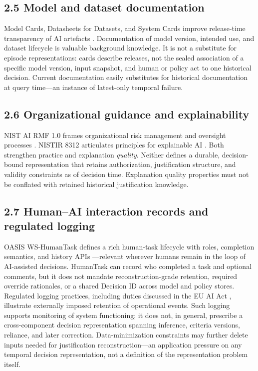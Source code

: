 \documentclass[11pt,a4paper]{article}
\begin{document}
\subsection{2.5 Model and dataset documentation}

Model Cards, Datasheets for Datasets, and System Cards improve release-time transparency of AI artefacts \citep{mitchell2019modelCards,gebru2021datasheets,procope2022systemCards}. Documentation of model version, intended use, and dataset lifecycle is valuable background knowledge. It is not a substitute for episode representations: cards describe releases, not the sealed association of a specific model version, input snapshot, and human or policy act to one historical decision. Current documentation easily substitutes for historical documentation at query time---an instance of latest-only temporal failure.


\subsection{2.6 Organizational guidance and explainability}

NIST AI RMF 1.0 frames organizational risk management and oversight processes \citep{nist2023aiRmf}. NISTIR 8312 articulates principles for explainable AI \citep{nist2021ir8312}. Both strengthen practice and explanation \emph{quality}. Neither defines a durable, decision-bound representation that retains authorization, justification structure, and validity constraints as of decision time. Explanation quality properties must not be conflated with retained historical justification knowledge.


\subsection{2.7 Human--AI interaction records and regulated logging}

OASIS WS-HumanTask defines a rich human-task lifecycle with roles, completion semantics, and history APIs \citep{oasis2010wsHumanTask}---relevant wherever humans remain in the loop of AI-assisted decisions. HumanTask can record who completed a task and optional comments, but it does not mandate reconstruction-grade retention, required override rationales, or a shared Decision ID across model and policy stores. Regulated logging practices, including duties discussed in the EU AI Act \citep{eu2024aiAct}, illustrate externally imposed retention of operational events. Such logging supports monitoring of system functioning; it does not, in general, prescribe a cross-component decision representation spanning inference, criteria versions, reliance, and later correction. Data-minimization constraints may further delete inputs needed for justification reconstruction---an application pressure on any temporal decision representation, not a definition of the representation problem itself.
\end{document}
